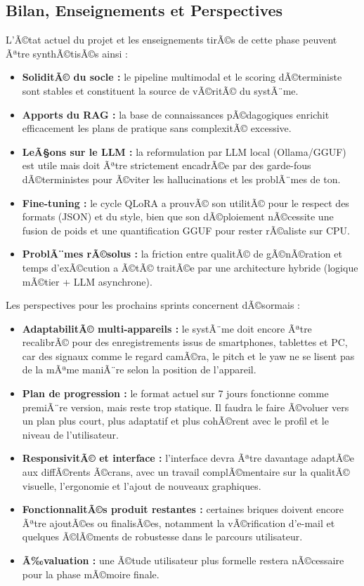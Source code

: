﻿\documentclass[12pt,a4paper]{article}
\begin{document}
\begin{itemize}
\section{Bilan, Enseignements et Perspectives}
L'Ã©tat actuel du projet et les enseignements tirÃ©s de cette phase peuvent Ãªtre synthÃ©tisÃ©s ainsi :

\begin{itemize}
    \item \textbf{SoliditÃ© du socle :} le pipeline multimodal et le scoring dÃ©terministe sont stables et constituent la source de vÃ©ritÃ© du systÃ¨me.
    \item \textbf{Apports du RAG :} la base de connaissances pÃ©dagogiques enrichit efficacement les plans de pratique sans complexitÃ© excessive.
    \item \textbf{LeÃ§ons sur le LLM :} la reformulation par LLM local (Ollama/GGUF) est utile mais doit Ãªtre strictement encadrÃ©e par des garde-fous dÃ©terministes pour Ã©viter les hallucinations et les problÃ¨mes de ton. 
    \item \textbf{Fine-tuning :} le cycle QLoRA a prouvÃ© son utilitÃ© pour le respect des formats (JSON) et du style, bien que son dÃ©ploiement nÃ©cessite une fusion de poids et une quantification GGUF pour rester rÃ©aliste sur CPU.
    \item \textbf{ProblÃ¨mes rÃ©solus :} la friction entre qualitÃ© de gÃ©nÃ©ration et temps d'exÃ©cution a Ã©tÃ© traitÃ©e par une architecture hybride (logique mÃ©tier + LLM asynchrone).
\end{itemize}

Les perspectives pour les prochains sprints concernent dÃ©sormais :
\begin{itemize}
    \item \textbf{AdaptabilitÃ© multi-appareils :} le systÃ¨me doit encore Ãªtre recalibrÃ© pour des enregistrements issus de smartphones, tablettes et PC, car des signaux comme le regard camÃ©ra, le pitch et le yaw ne se lisent pas de la mÃªme maniÃ¨re selon la position de l'appareil.
    \item \textbf{Plan de progression :} le format actuel sur 7 jours fonctionne comme premiÃ¨re version, mais reste trop statique. Il faudra le faire Ã©voluer vers un plan plus court, plus adaptatif et plus cohÃ©rent avec le profil et le niveau de l'utilisateur.
    \item \textbf{ResponsivitÃ© et interface :} l'interface devra Ãªtre davantage adaptÃ©e aux diffÃ©rents Ã©crans, avec un travail complÃ©mentaire sur la qualitÃ© visuelle, l'ergonomie et l'ajout de nouveaux graphiques.
    \item \textbf{FonctionnalitÃ©s produit restantes :} certaines briques doivent encore Ãªtre ajoutÃ©es ou finalisÃ©es, notamment la vÃ©rification d'e-mail et quelques Ã©lÃ©ments de robustesse dans le parcours utilisateur.
    \item \textbf{Ã‰valuation :} une Ã©tude utilisateur plus formelle restera nÃ©cessaire pour la phase mÃ©moire finale.
\end{itemize}


\end{itemize}
\end{document}
